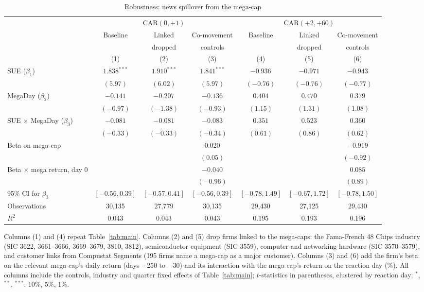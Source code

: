 \begin{table}[htbp]
\centering
\footnotesize
\setlength{\tabcolsep}{2.5pt}
\caption{Robustness: news spillover from the mega-cap}
\label{tab:robust_linked}
\begin{tabular}{lcccccc}
\toprule
 & \multicolumn{3}{c}{CAR$(0,+1)$} & \multicolumn{3}{c}{CAR$(+2,+60)$} \\
\cmidrule(lr){2-4} \cmidrule(lr){5-7}
 & Baseline & Linked & Co-movement & Baseline & Linked & Co-movement \\
 & & dropped & controls & & dropped & controls \\
 & (1) & (2) & (3) & (4) & (5) & (6) \\
\midrule
SUE ($\beta_1$) & $1.838^{***}$ & $1.910^{***}$ & $1.841^{***}$ & $-0.936$ & $-0.971$ & $-0.943$ \\
 & $(5.97)$ & $(6.02)$ & $(5.97)$ & $(-0.76)$ & $(-0.76)$ & $(-0.77)$ \\[2pt]
MegaDay ($\beta_2$) & $-0.141$ & $-0.207$ & $-0.136$ & $0.404$ & $0.470$ & $0.379$ \\
 & $(-0.97)$ & $(-1.38)$ & $(-0.93)$ & $(1.15)$ & $(1.31)$ & $(1.08)$ \\[2pt]
SUE $\times$ MegaDay ($\beta_3$) & $-0.081$ & $-0.081$ & $-0.083$ & $0.351$ & $0.523$ & $0.360$ \\
 & $(-0.33)$ & $(-0.33)$ & $(-0.34)$ & $(0.61)$ & $(0.86)$ & $(0.62)$ \\[2pt]
Beta on mega-cap &  &  & $0.020$ &  &  & $-0.919$ \\
 &  &  & $(0.05)$ &  &  & $(-0.92)$ \\[2pt]
Beta $\times$ mega return, day 0 &  &  & $-0.040$ &  &  & $0.085$ \\
 &  &  & $(-0.96)$ &  &  & $(0.89)$ \\[2pt]
\midrule
95\% CI for $\beta_3$ & $[-0.56, 0.39]$ & $[-0.57, 0.41]$ & $[-0.56, 0.39]$ & $[-0.78, 1.49]$ & $[-0.67, 1.72]$ & $[-0.78, 1.50]$ \\
Observations & 30,135 & 27,779 & 30,135 & 29,430 & 27,125 & 29,430 \\
$R^2$ & 0.043 & 0.043 & 0.043 & 0.195 & 0.193 & 0.196 \\
\bottomrule
\end{tabular}
\par\medskip
\parbox{0.97\linewidth}{\footnotesize Columns (1) and (4) repeat Table~\ref{tab:main}. Columns (2) and (5) drop firms linked to the mega-caps: the Fama-French 48 Chips industry (SIC 3622, 3661--3666, 3669--3679, 3810, 3812), semiconductor equipment (SIC 3559), computer and networking hardware (SIC 3570--3579), and customer links from Compustat Segments (195 firms name a mega-cap as a major customer). Columns (3) and (6) add the firm's beta on the relevant mega-cap's daily return (days $-250$ to $-30$) and its interaction with the mega-cap's return on the reaction day (\%). All columns include the controls, industry and quarter fixed effects of Table~\ref{tab:main}; $t$-statistics in parentheses, clustered by reaction day; $^{*}$, $^{**}$, $^{***}$: 10\%, 5\%, 1\%.}
\end{table}
